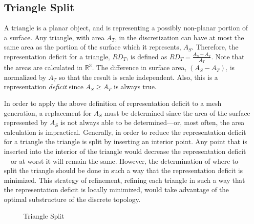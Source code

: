 \subsection{Triangle Split}
A triangle is a planar object, and is representing a possibly non-planar
portion of a surface. Any triangle, with area $A_T$, in the
discretization can have at most the same area as the portion of the
surface which it represents, $A_S$. Therefore, the representation
deficit for a triangle, $RD_T$, is defined as $RD_T = \frac{A_S -
A_T}{A_T}$. Note that the areas are calculated in ${\mathbb R}^3$. The
difference in surface area, $\left(A_S - A_T\right)$, is normalized by
$A_T$ so that the result is scale independent. Also, this is a
representation {\it deficit} since $A_S \ge A_T$ is always true.

In order to apply the above definition of representation deficit to a
mesh generation, a replacement for $A_S$ must be determined since the
area of the surface represented by $A_S$ is not always able to be
determined---or, most often, the area calculation is impractical.
Generally, in order to reduce the representation deficit for a triangle
the triangle is split by inserting an interior point. Any point that is
inserted into the interior of the triangle would decrease the
representation deficit---or at worst it will remain the same. However,
the determination of where to split the triangle should be done in such
a way that the representation deficit is minimized. This strategy of
refinement, refining each triangle in such a way that the representation
deficit is locally minimized, would take advantage of the optimal
substructure of the discrete topology.

\begin{figure}[h!]
  \caption{Triangle Split}
\end{figure}

